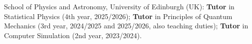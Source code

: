 \begin{cvlist}
  \item[] School of Physics and Astronomy, University of Edinburgh (UK):
    \textbf{Tutor} in Statistical Physics (4th year, 2025/2026);
    \textbf{Tutor} in Principles of Quantum Mechanics (3rd year, 2024/2025 and 2025/2026,
    also teaching duties);
    \textbf{Tutor} in Computer Simulation (2nd year, 2023/2024).%
\end{cvlist}
